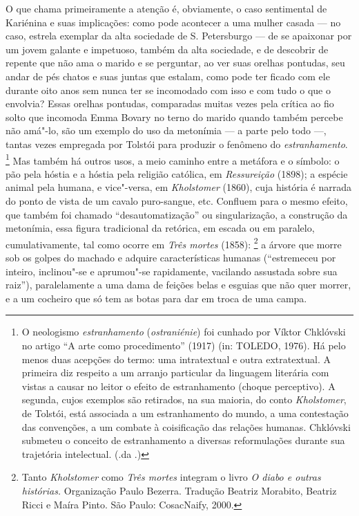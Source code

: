 O que chama primeiramente a atenção é, obviamente, o caso sentimental de
Kariénina e suas implicações: como pode acontecer a uma mulher
casada --- no caso, estrela exemplar da alta sociedade de S.
Petersburgo --- de se apaixonar por um jovem galante e impetuoso, também
da alta sociedade, e de descobrir de repente que não ama o marido e se
perguntar, ao ver suas orelhas pontudas, seu andar de pés chatos e suas
juntas que estalam, como pode ter ficado com ele durante oito anos sem
nunca ter se incomodado com isso e com tudo o que o envolvia? Essas orelhas
pontudas, comparadas muitas vezes pela crítica ao fio solto que incomoda
Emma Bovary no terno do marido quando também percebe não amá"-lo, são um
exemplo do uso da metonímia --- a parte pelo todo ---, tantas
vezes empregada por Tolstói para produzir o fenômeno do \emph{estranhamento}.
\footnote{O neologismo \emph{estranhamento} (\emph{ostraniénie}) foi cunhado por Víktor Chklóvski no artigo “A arte como procedimento” (1917) (in: TOLEDO, 1976). Há pelo menos duas acepções do termo: uma intratextual e outra extratextual.
A primeira diz respeito a um arranjo particular da linguagem literária com vistas a causar no leitor o efeito de estranhamento (choque perceptivo). A segunda, cujos exemplos são retirados, na sua maioria, do conto \emph{Kholstomer}, de
Tolstói, está associada a um estranhamento do mundo, a uma contestação das convenções, a um combate à coisificação das relações humanas. Chklóvski submeteu o conceito de estranhamento a diversas reformulações durante sua trajetória intelectual. (.da .)}
Mas também há outros usos, a meio caminho entre a metáfora e o símbolo:
o pão pela hóstia e a hóstia pela religião católica,
em \emph{Ressureição} (1898); a espécie animal pela
humana, e vice"-versa, em \emph{Kholstomer} (1860),
cuja história é narrada do ponto de vista de um cavalo puro-sangue, etc. Confluem para o
mesmo efeito, que também foi chamado ``desautomatização'' ou
singularização, a construção da metonímia, essa figura tradicional da
retórica, em escada ou em paralelo, cumulativamente, tal como
ocorre em \emph{Três mortes} (1858):
\footnote{Tanto \emph{Kholstomer} como \emph{Três mortes} integram o livro
\emph{O diabo e outras histórias.} Organização Paulo Bezerra. Tradução Beatriz
Morabito, Beatriz Ricci e Maíra Pinto. São Paulo: CosacNaify, 2000.} a árvore que morre sob os golpes
do machado e adquire características humanas (``estremeceu por
inteiro, inclinou"-se e aprumou"-se rapidamente, vacilando assustada sobre
sua raiz''), paralelamente a uma dama de feições belas e esguias que
não quer morrer, e a um cocheiro que só tem as botas para dar em troca
de uma campa.

